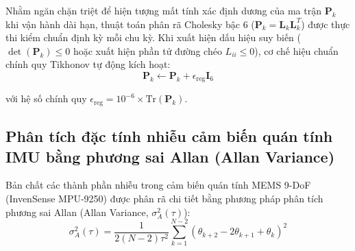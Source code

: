 \hspace{0.5cm} Nhằm ngăn chặn triệt để hiện tượng mất tính xác định dương của ma trận $\mathbf{P}_k$ khi vận hành dài hạn, thuật toán phân rã Cholesky bậc 6 ($\mathbf{P}_k = \mathbf{L}_k \mathbf{L}_k^T$) được thực thi kiểm chuẩn định kỳ mỗi chu kỳ. Khi xuất hiện dấu hiệu suy biến ($\det(\mathbf{P}_k) \le 0$ hoặc xuất hiện phần tử đường chéo $L_{ii} \le 0$), cơ chế hiệu chuẩn chính quy Tikhonov tự động kích hoạt:
\begin{equation}
\mathbf{P}_k \leftarrow \mathbf{P}_k + \epsilon_{\text{reg}} \mathbf{I}_6
\label{eq:tikhonov-regularization-formula}
\end{equation}

với hệ số chính quy $\epsilon_{\text{reg}} = 10^{-6} \times \text{Tr}(\mathbf{P}_k)$.

\begin{table}[H]
\centering
\caption{So sánh độ ổn định số học giữa bộ lọc Kalman chuẩn và Kalman Cholesky-Tikhonov}
\label{tab:cholesky-tikhonov-stability-table}
\end{table}

\subsection{Phân tích đặc tính nhiễu cảm biến quán tính IMU bằng phương sai Allan (Allan Variance)}

\hspace{0.5cm} Bản chất các thành phần nhiễu trong cảm biến quán tính MEMS 9-DoF (InvenSense MPU-9250) được phân rã chi tiết bằng phương pháp phân tích phương sai Allan (Allan Variance, $\sigma_A^2(\tau)$):
\begin{equation}
\sigma_A^2(\tau) = \frac{1}{2 (N - 2) \tau^2} \sum_{k=1}^{N-2} \left( \theta_{k+2} - 2\theta_{k+1} + \theta_k \right)^2
\label{eq:allan-variance-formula-w13}
\end{equation}

